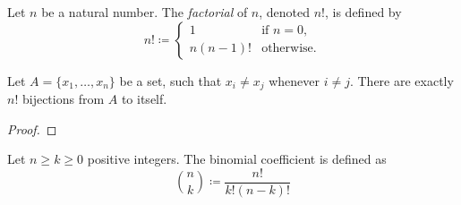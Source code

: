 \begin{definition} 
    Let $n$ be a natural number. The \emph{factorial} of $n$, denoted $n!$, is defined by
    \begin{equation*}
        n! \coloneqq
        \begin{cases}
            1 & \text{if } n = 0, \\
            n(n-1)! & \text{otherwise}.
        \end{cases}
    \end{equation*}
\end{definition}
\begin{proposition}
    Let $A = \{x_1, \ldots, x_n \}$ be a set, such that $x_i \neq x_j$ whenever $i \neq j$. There are exactly $n!$ bijections from $A$ to itself.
\end{proposition}
\begin{proof}
\end{proof}
\begin{definition}
    Let $n \geq k \geq 0$ positive integers. The binomial coefficient is defined as
    \begin{equation}
        \binom{n}{k} \coloneqq \frac{n!}{k!(n-k)!}
    \end{equation}  
\end{definition}